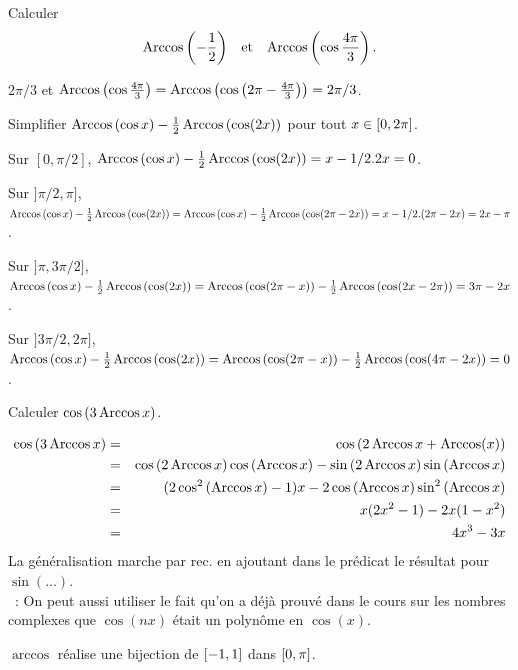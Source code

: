 \documentclass{magnolia}
\begin{document}
\begin{exos}
\exemple Calculer
  \[\operatorname{Arccos}\left(-\frac{1}{2}\right) \quad\!\text{et}\quad\! \operatorname{Arccos}\left(\cos\frac{4\pi}{3}\right).\]
  \begin{sol}
  $2\pi/3$ et $\operatorname{Arccos}\left(\cos\frac{4\pi}{3}\right)=\operatorname{Arccos}\left(\cos\left(2\pi-\frac{4\pi}{3}\right)\right)=2\pi/3$.
  \end{sol}
\exemple Simplifier $\operatorname{Arccos}\left(\cos x\right)-\frac{1}{2}\operatorname{Arccos}\left(\cos(2x)\right)$
  pour tout $x\in\left[0,2\pi\right]$.
  \begin{sol}
  Sur $[0,\pi/2]$, $\operatorname{Arccos}\left(\cos x\right)-\frac{1}{2}\operatorname{Arccos}\left(\cos(2x)\right)=x-1/2.2x=0$.
  
  Sur $]\pi/2,\pi]$, $\operatorname{Arccos}\left(\cos x\right)-\frac{1}{2}\operatorname{Arccos}\left(\cos(2x)\right)=\operatorname{Arccos}\left(\cos x\right)-\frac{1}{2}\operatorname{Arccos}\left(\cos(2\pi-2x)\right)=x-1/2.(2\pi-2x)=2x-\pi$.
  
  Sur $]\pi,3\pi/2]$, $\operatorname{Arccos}\left(\cos x\right)-\frac{1}{2}\operatorname{Arccos}\left(\cos(2x)\right)=\operatorname{Arccos}\left(\cos(2\pi- x)\right)-\frac{1}{2}\operatorname{Arccos}\left(\cos(2x-2\pi)\right)=3\pi-2x$.
  
  Sur $]3\pi/2,2\pi]$, $\operatorname{Arccos}\left(\cos x\right)-\frac{1}{2}\operatorname{Arccos}\left(\cos(2x)\right)=\operatorname{Arccos}\left(\cos (2\pi-x)\right)-\frac{1}{2}\operatorname{Arccos}\left(\cos(4\pi-2x)\right)=0$.
  
  \end{sol}
\exemple Calculer $\cos\left(3\operatorname{Arccos} x\right)$.
  \begin{sol}
  \begin{eqnarray*}
  \cos\left(3\operatorname{Arccos} x\right)&=&\cos\left(2\operatorname{Arccos} x+\operatorname{Arccos}(x)\right)\\
  &=&\cos\left(2\operatorname{Arccos} x\right)\cos\left(\operatorname{Arccos} x\right)-\sin\left(2\operatorname{Arccos} x\right)\sin\left(\operatorname{Arccos} x\right)\\
  &=&(2\cos^2\left(\operatorname{Arccos} x\right)-1)x-2\cos\left(\operatorname{Arccos} x\right)\sin^2\left(\operatorname{Arccos} x\right)\\
  &=&x(2x^2-1)-2x(1-x^2)\\
  &=&4x^3-3x
  \end{eqnarray*}
  La généralisation marche par rec. en ajoutant dans le prédicat le résultat pour $\sin(...)$.\\
  ~: On peut aussi utiliser le fait qu'on a déjà prouvé dans le cours sur les nombres complexes que $\cos(nx)$ était un polynôme en $\cos(x)$.
  \end{sol}
\end{exos}

\begin{proposition}[utile=-3]
$\arccos$ réalise une bijection de $\left[-1,1\right]$ dans $\left[0,\pi\right]$.
\end{proposition}
\end{document}

